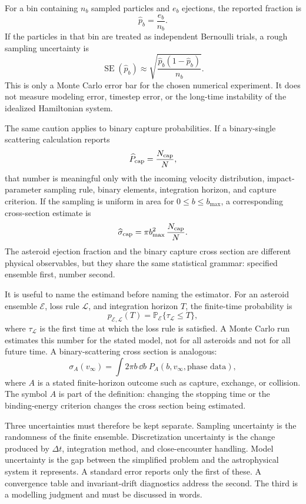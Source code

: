 For a bin containing \(n_b\) sampled particles and \(e_b\) ejections, the
reported fraction is
\[
  \widehat p_b=\frac{e_b}{n_b}.
\]
If the particles in that bin are treated as independent Bernoulli trials, a
rough sampling uncertainty is
\[
  \operatorname{SE}(\widehat p_b)
  \approx
  \sqrt{\frac{\widehat p_b(1-\widehat p_b)}{n_b}}.
\]
This is only a Monte Carlo error bar for the chosen numerical experiment. It
does not measure modeling error, timestep error, or the long-time instability
of the idealized Hamiltonian system.

The same caution applies to binary capture probabilities.  If a binary-single
scattering calculation reports
\[
  \widehat P_{\rm cap}
  =
  \frac{N_{\rm cap}}{N},
\]
that number is meaningful only with the incoming velocity distribution,
impact-parameter sampling rule, binary elements, integration horizon, and
capture criterion.  If the sampling is uniform in area for
\(0\le b\le b_{\max}\), a corresponding cross-section estimate is
\[
  \widehat\sigma_{\rm cap}
  =
  \pi b_{\max}^2\,\frac{N_{\rm cap}}{N}.
\]
The asteroid ejection fraction and the binary capture cross section are
different physical observables, but they share the same statistical grammar:
specified ensemble first, number second.

It is useful to name the estimand before naming the estimator.  For an
asteroid ensemble \(\mathcal E\), loss rule \(\mathcal L\), and integration
horizon \(T\), the finite-time probability is
\[
  p_{\mathcal E,\mathcal L}(T)
  =
  \mathbb P_{\mathcal E}\{\tau_{\mathcal L}\le T\},
\]
where \(\tau_{\mathcal L}\) is the first time at which the loss rule is
satisfied.  A Monte Carlo run estimates this number for the stated model, not
for all asteroids and not for all future time.  A binary-scattering cross
section is analogous:
\[
  \sigma_A(v_\infty)
  =
  \int 2\pi b\,\dd b\;
  P_A(b,v_\infty,\text{phase data}),
\]
where \(A\) is a stated finite-horizon outcome such as capture, exchange, or
collision.  The symbol \(A\) is part of the definition: changing the stopping
time or the binding-energy criterion changes the cross section being
estimated.

Three uncertainties must therefore be kept separate.  Sampling uncertainty is
the randomness of the finite ensemble.  Discretization uncertainty is the
change produced by \(\Delta t\), integration method, and close-encounter
handling.  Model uncertainty is the gap between the simplified problem and the
astrophysical system it represents.  A standard error reports only the first
of these.  A convergence table and invariant-drift diagnostics address the
second.  The third is a modelling judgment and must be discussed in words.

